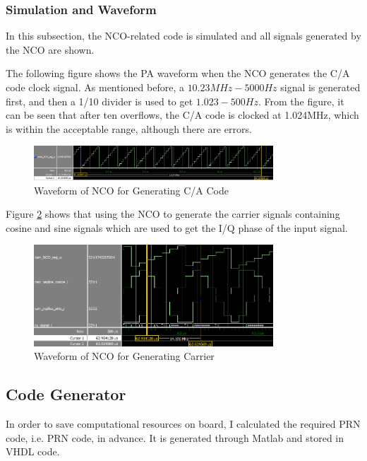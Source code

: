 \subsubsection{Simulation and Waveform}
In this subsection, the NCO-related code is simulated and all signals generated by the NCO are shown.

The following figure shows the PA waveform when the NCO generates the C/A code clock signal. As mentioned before, a $10.23MHz-\num{5000}Hz$ signal is generated first, and then a 1/10 divider is used to get $1.023-500Hz$. From the figure, it can be seen that after ten overflows, the C/A code is clocked at 1.024MHz, which is within the acceptable range, although there are errors.

\begin{figure}[!htbp]
    \centering
    \includegraphics[width=0.8\textwidth]{_IMAGES/nco_code_wave.png}
    \caption{Waveform of NCO for Generating C/A Code}
    \label{fig:nco_code_wave}
\end{figure}

Figure \ref{fig:nco_carrier_wave} shows that using the NCO to generate the carrier signals containing cosine and sine signals which are used to get the I/Q phase of the input signal.

\begin{figure}[!htbp]
    \centering
    \includegraphics[width=0.8\textwidth]{_IMAGES/nco_carrier_wave.png}
    \caption{Waveform of NCO for Generating Carrier}
    \label{fig:nco_carrier_wave}
\end{figure}

\subsection{Code Generator}
In order to save computational resources on board, I calculated the required PRN code, i.e. PRN  code, in advance. It is generated through Matlab and stored in VHDL code.

